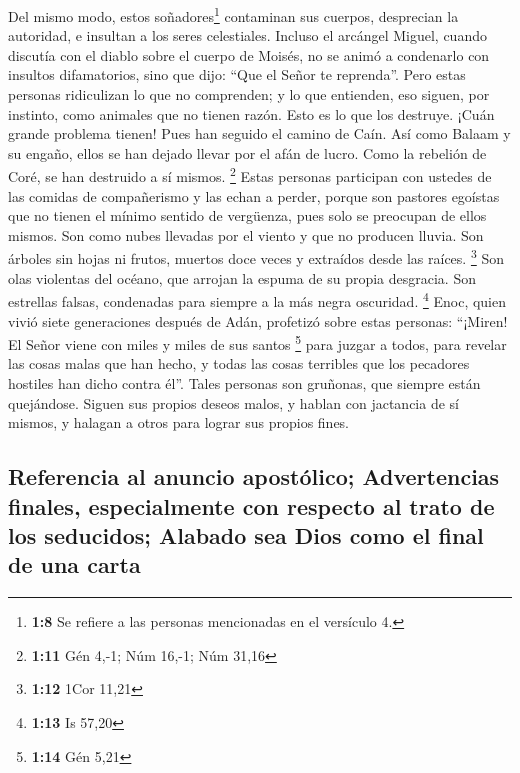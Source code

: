  Del mismo modo, estos soñadores\footnote{\textbf{1:8} Se
  refiere a las personas mencionadas en el versículo 4.} contaminan sus
cuerpos, desprecian la autoridad, e insultan a los seres celestiales.
 Incluso el arcángel Miguel, cuando discutía con el diablo
sobre el cuerpo de Moisés, no se animó a condenarlo con insultos
difamatorios, sino que dijo: ``Que el Señor te reprenda''.
 Pero estas personas ridiculizan lo que no comprenden; y
lo que entienden, eso siguen, por instinto, como animales que no tienen
razón. Esto es lo que los destruye.  ¡Cuán grande
problema tienen! Pues han seguido el camino de Caín. Así como Balaam y
su engaño, ellos se han dejado llevar por el afán de lucro. Como la
rebelión de Coré, se han destruido a sí mismos. \footnote{\textbf{1:11}
  Gén 4,-1; Núm 16,-1; Núm 31,16}  Estas personas
participan con ustedes de las comidas de compañerismo y las echan a
perder, porque son pastores egoístas que no tienen el mínimo sentido de
vergüenza, pues solo se preocupan de ellos mismos. Son como nubes
llevadas por el viento y que no producen lluvia. Son árboles sin hojas
ni frutos, muertos doce veces y extraídos desde las raíces. \footnote{\textbf{1:12}
  1Cor 11,21}  Son olas violentas del océano, que arrojan
la espuma de su propia desgracia. Son estrellas falsas, condenadas para
siempre a la más negra oscuridad. \footnote{\textbf{1:13} Is 57,20}
 Enoc, quien vivió siete generaciones después de Adán,
profetizó sobre estas personas: ``¡Miren! El Señor viene con miles y
miles de sus santos \footnote{\textbf{1:14} Gén 5,21} 
para juzgar a todos, para revelar las cosas malas que han hecho, y todas
las cosas terribles que los pecadores hostiles han dicho contra él''.
 Tales personas son gruñonas, que siempre están
quejándose. Siguen sus propios deseos malos, y hablan con jactancia de
sí mismos, y halagan a otros para lograr sus propios fines.

\hypertarget{referencia-al-anuncio-apostuxf3lico-advertencias-finales-especialmente-con-respecto-al-trato-de-los-seducidos-alabado-sea-dios-como-el-final-de-una-carta}{%
\subsection{Referencia al anuncio apostólico; Advertencias finales,
especialmente con respecto al trato de los seducidos; Alabado sea Dios
como el final de una
carta}\label{referencia-al-anuncio-apostuxf3lico-advertencias-finales-especialmente-con-respecto-al-trato-de-los-seducidos-alabado-sea-dios-como-el-final-de-una-carta}}

